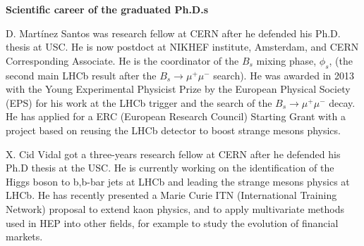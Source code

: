 {\bf Scientific career of the graduated Ph.D.s}


D. Mart\'inez Santos was research fellow at CERN after he defended his Ph.D. thesis at USC. He is now postdoct at NIKHEF institute, Amsterdam, and CERN Corresponding Associate. He is the coordinator of the $B_s$ mixing phase, $\phi_s$, (the second main LHCb result after the $B_s \to \mu^+\mu^-$ search). He was awarded in 2013 with the Young Experimental Physicist Prize by the European Physical Society (EPS) for his work at the LHCb trigger and the search of the $B_s \to \mu^+ \mu^-$ decay. He has applied for a ERC (European Research Council) Starting Grant with a project based on reusing the LHCb detector to boost strange mesons physics. 

X. Cid Vidal got a three-years research fellow at CERN after he defended his Ph.D thesis at the USC. He is currently working on the identification of the Higgs boson to b,b-bar jets at LHCb and leading the strange mesons physics at LHCb. He has recently presented a Marie Curie ITN  (International Training Network) proposal to extend kaon physics, and to apply multivariate methods used in HEP into other fields, for example to study the evolution of financial markets.
 


